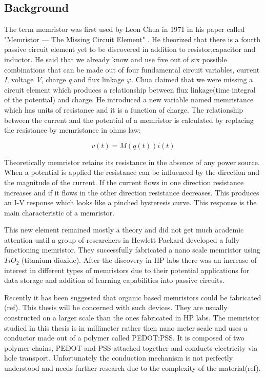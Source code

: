 \begin{doublespace}
\section{Background}
The term memristor was first used by Leon Chua in 1971 in his paper called  "Memristor — The Missing Circuit Element" \cite{chua}. He theorized that there is a fourth passive circuit element yet to be discovered in addition to resistor,capacitor and inductor. He said that we already know and use five out of six possible combinations that can be made out of four fundamental circuit variables, current \textit{I}, voltage \textit{V}, charge \textit{q} and flux linkage \textit{$\varphi$}. Chua claimed that we were missing a circuit element which produces a relationship between flux linkage(time integral of the potential) and charge. He introduced a new variable named memristance which has units of resistance and it is a function of charge. The relationship between the current and the potential of a memristor is calculated by replacing the resistance by memristance in ohms law:


\begin{equation}
v(t)=M(q(t))i(t)
\end{equation}

Theoretically memristor retains its resistance in the absence of any power source. When a potential is applied the resistance can be influenced by the direction and the magnitude of the current. If the current flows in one direction resistance increases and if it flows in the other direction resistance decreases. This produces an I-V response which looks like a pinched hysteresis curve. This response is the main characteristic of a memristor. 

This new element remained mostly a theory and did not get much academic attention until a group of researchers in Hewlett Packard developed a fully functioning memristor. They successfully fabricated a nano scale memristor using $TiO_2$ (titanium dioxide). After the discovery in HP labs there was an increase of interest in different types of memristors due to their potential applications for data storage and addition of learning capabilities into passive circuits. 

Recently it has been suggested that organic based memristors could be fabricated (ref). This thesis will be concerned with such devices. They are usually constructed on a larger scale than the ones fabricated in HP labs. The memristor studied in this thesis is in millimeter rather then nano meter scale and uses a conductor made out of a polymer called PEDOT:PSS. It is composed of two polymer chains, PEDOT and PSS attached together and conducts electricity via hole transport. Unfortunately the conduction mechanism is not perfectly understood and needs further research due to the complexity of the material(ref).


\end{doublespace}
